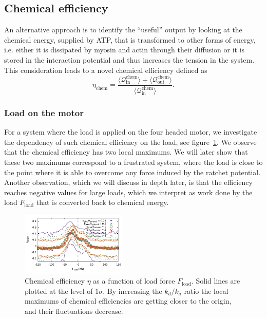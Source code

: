 \documentclass[aps,pre,twocolumn,showpacs,showkeys,superscriptaddress,floatfix]{revtex4-1}
\begin{document}
\subsection{Chemical efficiency} 
\label{sec:chemical_efficiency}
An alternative approach is to identify the ``useful'' output by looking at the chemical energy, supplied by ATP, that is transformed to other forms of energy, 
i.e. either it is dissipated by myosin and actin through their diffusion or it is stored in the interaction potential and thus increases the tension in the system. 
This consideration leads to a novel chemical efficiency defined as 
\begin{equation}
\eta_\text{chem} = \frac{\langle\mathcal Q^\text{chem}_\text{in}\rangle+\langle\mathcal Q^\text{chem}_\text{out}\rangle}{\langle\mathcal Q^\text{chem}_\text{in}\rangle} .
\label{eq:efficiency}
\end{equation}

\subsubsection{Load on the motor}
For a system where the load is applied on the four headed motor, we investigate the dependency of such chemical efficiency on the load, see figure~\ref{fig:chem}.
We observe that the chemical efficiency has two local maximums. 
We will later show that these two maximums correspond to a frustrated system, 
where the load is close to the point where it is able to overcome any force induced by the ratchet potential. 
Another observation, which we will discuss in depth later, is that the efficiency reaches negative values for large loads, 
which we interpret as work done by the load $F_\text{load}$ that is converted back to chemical energy. 
\begin{figure}[t]
\centering
\includegraphics[width=0.45\textwidth,height=!]{chemical_cycle}
\caption{
\label{fig:chem}
Chemical efficiency $\eta$ as a function of load force $F_\text{load}$.
Solid lines are plotted at the level of $1\sigma$. 
By increasing the $k_d/k_a$ ratio the local maximums of chemical efficiencies are getting closer to the origin,
and their fluctuations decrease. 
}
\end{figure}
\end{document}
